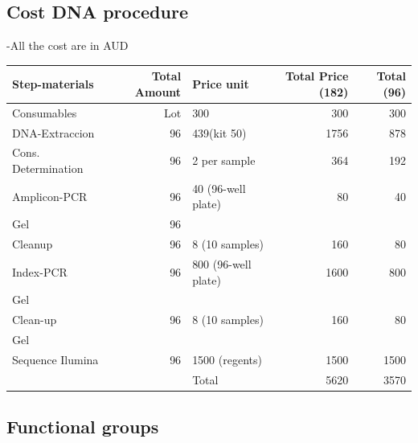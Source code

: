 \documentclass[11pt]{article}
\begin{document}
\subsection*{Cost DNA procedure}
\label{sec-7-2}

-All the cost are in AUD

\begin{center}
\begin{tabular}{lrlrr}
 Step-materials       &  Total Amount  &  Price unit           &  Total Price (182)  &  Total (96)  \\
\hline
 Consumables          &           Lot  &  300                  &                300  &         300  \\
 DNA-Extraccion       &            96  &  439(kit 50)          &               1756  &         878  \\
 Cons. Determination  &            96  &  2 per sample         &                364  &         192  \\
 Amplicon-PCR         &            96  &  40 (96-well plate)   &                 80  &          40  \\
 Gel                  &            96  &                       &                     &              \\
 Cleanup              &            96  &  8 (10 samples)       &                160  &          80  \\
 Index-PCR            &            96  &  800 (96-well plate)  &               1600  &         800  \\
 Gel                  &                &                       &                     &              \\
 Clean-up             &            96  &  8 (10 samples)       &                160  &          80  \\
 Gel                  &                &                       &                     &              \\
 Sequence Ilumina     &            96  &  1500 (regents)       &               1500  &        1500  \\
\hline
                      &                &  Total                &               5620  &        3570  \\
\end{tabular}
\end{center}
\subsection*{Functional groups}
\label{sec-7-3}
\end{document}
